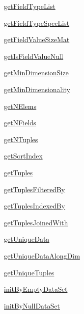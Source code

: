 \begin{list}{}{}
 \item \hyperref[method:smartdb.relations.ATypifiedStaticRelation.getFieldTypeList]{getFieldTypeList}
 \item \hyperref[method:smartdb.relations.ATypifiedStaticRelation.getFieldTypeSpecList]{getFieldTypeSpecList}
 \item \hyperref[method:smartdb.relations.ATypifiedStaticRelation.getFieldValueSizeMat]{getFieldValueSizeMat}
 \item \hyperref[method:smartdb.relations.ATypifiedStaticRelation.getIsFieldValueNull]{getIsFieldValueNull}
 \item \hyperref[method:smartdb.relations.ATypifiedStaticRelation.getMinDimensionSize]{getMinDimensionSize}
 \item \hyperref[method:smartdb.relations.ATypifiedStaticRelation.getMinDimensionality]{getMinDimensionality}
 \item \hyperref[method:smartdb.relations.ATypifiedStaticRelation.getNElems]{getNElems}
 \item \hyperref[method:smartdb.relations.ATypifiedStaticRelation.getNFields]{getNFields}
 \item \hyperref[method:smartdb.relations.ATypifiedStaticRelation.getNTuples]{getNTuples}
 \item \hyperref[method:smartdb.relations.ATypifiedStaticRelation.getSortIndex]{getSortIndex}
 \item \hyperref[method:smartdb.relations.ATypifiedStaticRelation.getTuples]{getTuples}
 \item \hyperref[method:smartdb.relations.ATypifiedStaticRelation.getTuplesFilteredBy]{getTuplesFilteredBy}
 \item \hyperref[method:smartdb.relations.ATypifiedStaticRelation.getTuplesIndexedBy]{getTuplesIndexedBy}
 \item \hyperref[method:smartdb.relations.ATypifiedStaticRelation.getTuplesJoinedWith]{getTuplesJoinedWith}
 \item \hyperref[method:smartdb.relations.ATypifiedStaticRelation.getUniqueData]{getUniqueData}
 \item \hyperref[method:smartdb.relations.ATypifiedStaticRelation.getUniqueDataAlongDim]{getUniqueDataAlongDim}
 \item \hyperref[method:smartdb.relations.ATypifiedStaticRelation.getUniqueTuples]{getUniqueTuples}
 \item \hyperref[method:smartdb.relations.ATypifiedStaticRelation.initByEmptyDataSet]{initByEmptyDataSet}
 \item \hyperref[method:smartdb.relations.ATypifiedStaticRelation.initByNullDataSet]{initByNullDataSet}

\end{list}
